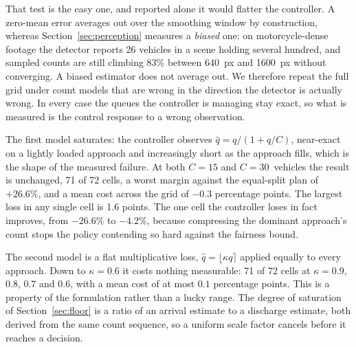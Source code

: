 %

That test is the easy one, and reported alone it would flatter the controller. A zero-mean
error averages out over the smoothing window by construction, whereas
Section~\ref{sec:perception} measures a \emph{biased} one: on motorcycle-dense footage the
detector reports 26 vehicles in a scene holding several hundred, and sampled counts are still
climbing 83\% between 640~px and 1600~px without converging. A biased estimator does not
average out. We therefore repeat the full grid under count models that are wrong in the
direction the detector is actually wrong. In every case the queues the controller is managing
stay exact, so what is measured is the control response to a wrong observation.

The first model saturates: the controller observes $\hat q = q/(1 + q/C)$, near-exact on a
lightly loaded approach and increasingly short as the approach fills, which is the shape of the
measured failure. At both $C = 15$ and $C = 30$~vehicles the result is unchanged, 71 of 72
cells, a worst margin against the equal-split plan of $+26.6\%$, and a mean cost across the grid
of $-0.3$ percentage points. The largest loss in any single cell is 1.6 points. The one cell the
controller loses in fact improves, from $-26.6\%$ to $-4.2\%$, because compressing the dominant
approach's count stops the policy contending so hard against the fairness bound.

The second model is a flat multiplicative loss, $\hat q = \lfloor \kappa q \rceil$ applied
equally to every approach. Down to $\kappa = 0.6$ it costs nothing measurable: 71 of 72 cells at
$\kappa = 0.9$, $0.8$, $0.7$ and $0.6$, with a mean cost of at most $0.1$ percentage points.
This is a property of the formulation rather than a lucky range. The degree of saturation of
Section~\ref{sec:floor} is a ratio of an arrival estimate to a discharge estimate, both derived
from the same count sequence, so a uniform scale factor cancels before it reaches a decision.


